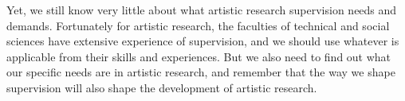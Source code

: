 \documentclass[12pt]{article}
\begin{document}

Yet, we still know very little about what artistic research supervision needs and demands. Fortunately for artistic research, the faculties of technical and social sciences have extensive experience of supervision, and we should use whatever is applicable from their skills and experiences. But we also need to find out what our specific needs are in artistic research, and remember that the way we shape supervision will also shape the development of artistic research.

 
\end{document}
